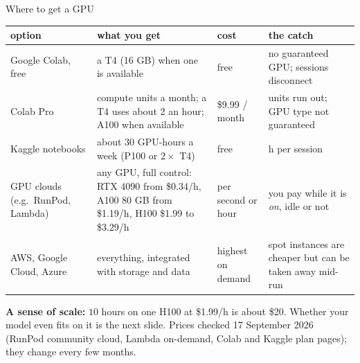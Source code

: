 \documentclass[aspectratio=43]{beamer}
\begin{document}
\begin{frame}{Where to get a GPU}
  \begin{center}\scriptsize
  \begin{tabular}{@{}>{\raggedright\arraybackslash}p{1.9cm}
                    >{\raggedright\arraybackslash}p{3.5cm}
                    >{\raggedright\arraybackslash}p{1.6cm}
                    >{\raggedright\arraybackslash}p{2.5cm}@{}}
    \textbf{option} & \textbf{what you get} & \textbf{cost} & \textbf{the catch} \\ \hline
    Google Colab, free & a T4 (16 GB) when one is available & free & no guaranteed GPU; sessions
      disconnect \\[3pt]
    Colab Pro & 100 compute units a month; a T4 uses about 2 an hour; A100 when available &
      \$9.99 / month & units run out; GPU type not guaranteed \\[3pt]
    Kaggle notebooks & about 30 GPU-hours a week (P100 or $2\times$ T4) & free & 12 h per
      session \\[3pt]
    GPU clouds (e.g.\ RunPod, Lambda) & any GPU, full control: RTX 4090 from \$0.34/h, A100
      80 GB from \$1.19/h, H100 \$1.99 to \$3.29/h & per second or hour & you pay while it is
      \emph{on}, idle or not \\[3pt]
    AWS, Google Cloud, Azure & everything, integrated with storage and data & highest on demand &
      spot instances are cheaper but can be taken away mid-run \\
  \end{tabular}
  \end{center}
  \vfill
  {\small \textbf{A sense of scale:} $10$ hours on one H100 at \$1.99/h is about \$20. Whether your
  model even fits on it is the next slide.}
  \vfill
  {\scriptsize\color{gray} Prices checked 17 September 2026 (RunPod community cloud, Lambda
  on-demand, Colab and Kaggle plan pages); they change every few months.}
\end{frame}
\end{document}
